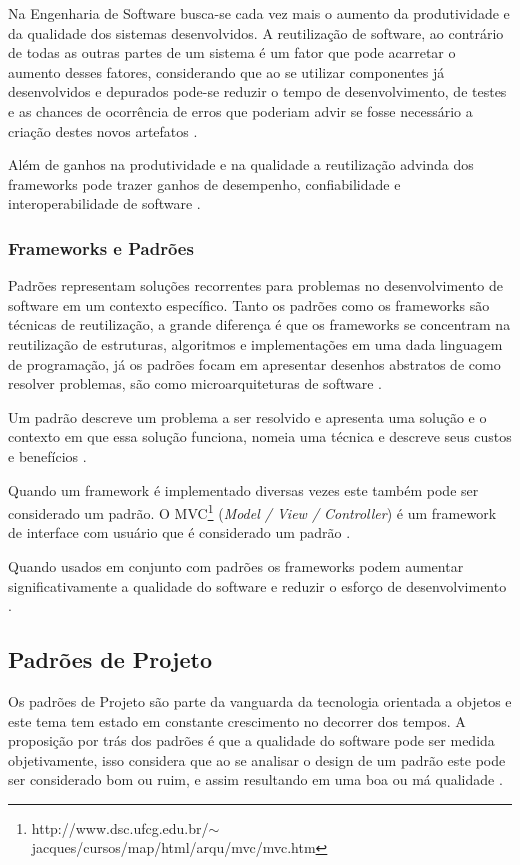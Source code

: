 Na Engenharia de Software busca-se cada vez mais o aumento da produtividade e da qualidade dos sistemas desenvolvidos. A reutilização de software, ao contrário de todas as outras partes de um sistema é um fator que pode acarretar o aumento desses fatores, considerando que ao se utilizar componentes já desenvolvidos e depurados pode-se reduzir o tempo de desenvolvimento, de testes e as chances de ocorrência de erros que poderiam advir se fosse necessário a criação destes novos artefatos \cite{Silva:2000}.

Além de ganhos na produtividade e na qualidade a reutilização advinda dos frameworks pode trazer ganhos de desempenho, confiabilidade e interoperabilidade de software \cite{Fayad:Schimidt:1997}.

\subsubsection{Frameworks e Padrões}

Padrões representam soluções recorrentes para problemas no desenvolvimento de software em um contexto específico. Tanto os padrões como os frameworks são técnicas de reutilização, a grande diferença é que os frameworks 	se concentram na reutilização de estruturas, algoritmos e implementações em uma dada linguagem de programação, já os padrões focam em apresentar desenhos abstratos de como resolver problemas, são como microarquiteturas de software \cite{Fayad:Schimidt:1997}.

Um padrão descreve um problema a ser resolvido e apresenta uma solução e o contexto em que essa solução funciona, nomeia uma técnica e descreve seus custos e benefícios \cite{Johnson:1997}.

Quando um framework é implementado diversas vezes este também pode ser considerado um padrão. O MVC\footnote{http://www.dsc.ufcg.edu.br/$\sim$jacques/cursos/map/html/arqu/mvc/mvc.htm} (\textit{Model / View / Controller}) é um framework de interface com usuário que é considerado um padrão \cite{Johnson:1997}.

Quando usados em conjunto com padrões os frameworks podem aumentar significativamente a qualidade do software e reduzir o esforço de desenvolvimento \cite{Fayad:Schimidt:1997}.

\subsection{Padrões de Projeto}

Os padrões de Projeto são parte da vanguarda da tecnologia orientada a objetos e este tema tem estado em constante crescimento no decorrer dos tempos. A proposição por trás dos padrões é que a qualidade do software pode ser medida objetivamente, isso considera que ao se analisar o design de um padrão este pode ser considerado bom ou ruim, e assim resultando em uma boa ou má qualidade \cite{Shalloway:Trott:2004}.


